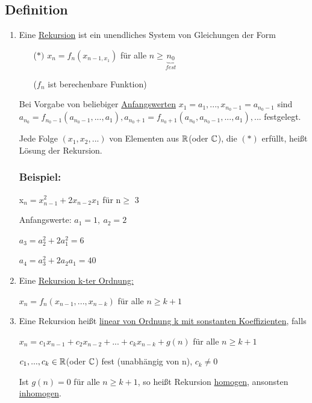 \subsection{Definition}
\begin{enumerate}
	\item Eine \underline{Rekursion} ist ein unendliches System von Gleichungen der Form
	
	\begin{itemize}
		\item[($*)$] $x_n = f_n(x_{n-1,x_1})$ für alle $n\geq \underbrace{n_0}_{fest} $
		
		($f_n$ ist berechenbare Funktion)
		
	\end{itemize}
	Bei Vorgabe von beliebiger \underline{Anfangswerten} $x_1 = a_1,...,x_{n_0-1}=a_{n_0-1}$ sind $ a_{n_0}= f_{n_0-1}( a_{n_0-1},...,a_{1}), a_{n_0+1}= f_{n_0+1}(a_{n_0},a_{n_0-1},...,a_{1}),...$ festgelegt.
	
	Jede Folge $(x_1,x_2,...)$ von Elementen aus $\operatorname{\mathbb{R}}$(oder $\operatorname{\mathbb{C}}$), die $(*)$ erfüllt, heißt Lösung der Rekursion.
	
	\subsubsection*{Beispiel:}
	x$_n= x_{n-1}^2+2x_{n-2}x_1$ für n$\geq$ 3
	
	Anfangswerte: $a_1=1,~ a_2=2$
	
	$a_3 = a_2^2+2a_1^2=6$
	
	$a_4 = a_3^2+2a_2a_1=40$
	
	\item Eine \underline{Rekursion k-ter Ordnung:}
	
	$x_n=f_n(x_{n-1},...,x_{n-k}) $ für alle $n\geq k+1$
	
	\item Eine Rekursion heißt \underline{linear von Ordnung k mit sonstanten Koeffizienten}, falls
	
	$x_n= c_1x_{n-1}+c_2x_{n-2}+...+c_kx_{n-k} +g(n)$ für alle $ n\geq k+1$
	
	$c_1,...,c_k \in \operatorname{\mathbb{R}} $(oder $\operatorname{\mathbb{C}}$) fest (unabhängig von n), $c_k \neq 0$
	
	Ist $g(n)=0$ für alle $n\geq k+1$, so heißt Rekursion \underline{homogen}, ansonsten \underline{inhomogen}. 
	
\end{enumerate}


